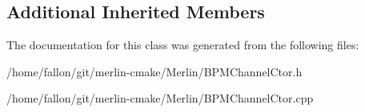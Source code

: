 \subsection*{Additional Inherited Members}


The documentation for this class was generated from the following files\+:\begin{DoxyCompactItemize}
\item 
/home/fallon/git/merlin-\/cmake/\+Merlin/B\+P\+M\+Channel\+Ctor.\+h\item 
/home/fallon/git/merlin-\/cmake/\+Merlin/B\+P\+M\+Channel\+Ctor.\+cpp\end{DoxyCompactItemize}
